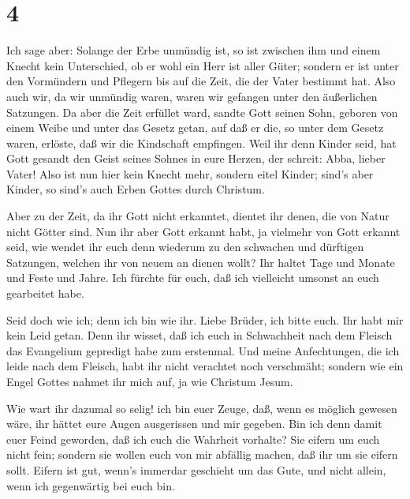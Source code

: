 \hypertarget{section-3}{%
\section{4}\label{section-3}}

 Ich sage aber: Solange der Erbe unmündig ist, so ist
zwischen ihm und einem Knecht kein Unterschied, ob er wohl ein Herr ist
aller Güter;  sondern er ist unter den Vormündern und
Pflegern bis auf die Zeit, die der Vater bestimmt hat.  Also
auch wir, da wir unmündig waren, waren wir gefangen unter den
äußerlichen Satzungen.  Da aber die Zeit erfüllet ward,
sandte Gott seinen Sohn, geboren von einem Weibe und unter das Gesetz
getan,  auf daß er die, so unter dem Gesetz waren, erlöste,
daß wir die Kindschaft empfingen.  Weil ihr denn Kinder
seid, hat Gott gesandt den Geist seines Sohnes in eure Herzen, der
schreit: Abba, lieber Vater!  Also ist nun hier kein Knecht
mehr, sondern eitel Kinder; sind's aber Kinder, so sind's auch Erben
Gottes durch Christum.

 Aber zu der Zeit, da ihr Gott nicht erkanntet, dientet ihr
denen, die von Natur nicht Götter sind.  Nun ihr aber Gott
erkannt habt, ja vielmehr von Gott erkannt seid, wie wendet ihr euch
denn wiederum zu den schwachen und dürftigen Satzungen, welchen ihr von
neuem an dienen wollt?  Ihr haltet Tage und Monate und
Feste und Jahre.  Ich fürchte für euch, daß ich vielleicht
umsonst an euch gearbeitet habe.

 Seid doch wie ich; denn ich bin wie ihr. Liebe Brüder, ich
bitte euch. Ihr habt mir kein Leid getan.  Denn ihr wisset,
daß ich euch in Schwachheit nach dem Fleisch das Evangelium gepredigt
habe zum erstenmal.  Und meine Anfechtungen, die ich leide
nach dem Fleisch, habt ihr nicht verachtet noch verschmäht; sondern wie
ein Engel Gottes nahmet ihr mich auf, ja wie Christum Jesum.

 Wie wart ihr dazumal so selig! ich bin euer Zeuge, daß,
wenn es möglich gewesen wäre, ihr hättet eure Augen ausgerissen und mir
gegeben.  Bin ich denn damit euer Feind geworden, daß ich
euch die Wahrheit vorhalte?  Sie eifern um euch nicht fein;
sondern sie wollen euch von mir abfällig machen, daß ihr um sie eifern
sollt.  Eifern ist gut, wenn's immerdar geschieht um das
Gute, und nicht allein, wenn ich gegenwärtig bei euch bin.

